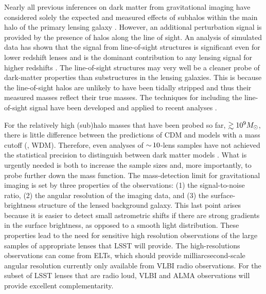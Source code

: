Nearly all previous inferences on dark matter from gravitational imaging have considered solely the expected and measured effects of subhalos within the main halo of the primary lensing galaxy \citep[\eg,][]{Vegetti:2009aa, Vegetti_2012, Vegetti2014, Hezaveh_2016ltk}.
However, an additional perturbation signal is provided by the presence of halos along the line of sight.
An analysis of simulated data has shown that the signal from line-of-sight structures is significant even for lower redshift lenses and is the dominant contribution to any lensing signal for higher redshifts \citep{Keeton:2002ug,Despali++18}.
The line-of-sight structures may very well be a cleaner probe of dark-matter properties than substructures in the lensing galaxies.
This is because the line-of-sight halos are unlikely to have been tidally stripped and thus their measured masses reflect their true masses.
The techniques for including the line-of-sight signal have been developed and applied to recent analyses \citep{Ritondale++18}. 
 
For the relatively high (sub)halo masses that have been probed so far, $\gtrsim 10^9M_\odot$, there is little difference between the predictions of CDM and models with a mass cutoff (\eg, WDM).
Therefore, even analyses of $ {\sim}\,10$-lens samples have not achieved the statistical precision to distinguish between dark matter models \citep{Vegetti2014, Ritondale++18}.
What is urgently needed is both to increase the sample sizes and, more importantly, to probe further down the mass function.
The mass-detection limit for gravitational imaging is set by three properties of the observations: (1) the signal-to-noise ratio, (2) the angular resolution of the imaging data, and (3) the surface-brightness structure of the lensed background galaxy.  This last point arises because it is easier to detect small astrometric shifts if there are strong gradients in the surface brightness, as opposed to a smooth light distribution.
These properties lead to the need for sensitive high resolution observations of the large samples of appropriate lenses that LSST will provide.
The high-resolutions observations can come from ELTs, which should provide milliarcsecond-scale angular resolution currently only available from VLBI radio observations.
For the subset of LSST lenses that are radio loud, VLBI and ALMA observations will provide excellent complementarity.

